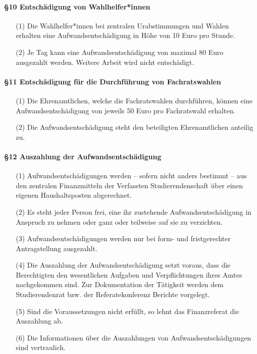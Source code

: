     \paragraph{§10 Entschädigung von Wahlhelfer*innen}
        \begin{itemize}
            \item[(1)] Die Wahlhelfer*innen bei zentralen Urabstimmungen und Wahlen erhalten eine Aufwandsentschädigung in Höhe von 10 Euro pro Stunde.
            \item[(2)] Je Tag kann eine Aufwandsentschädigung von maximal 80 Euro ausgezahlt werden. Weitere Arbeit wird nicht entschädigt. 
        \end{itemize} 
    \paragraph{§11 Entschädigung für die Durchführung von Fachratswahlen}
        \begin{itemize}
            \item[(1)]  Die Ehrenamtlichen, welche die Fachratswahlen durchführen, können eine Aufwandsentschädigung von jeweils 50 Euro pro Fachratswahl erhalten. 
            \item[(2)]  Die Aufwandsentschädigung steht den beteiligten Ehrenamtlichen anteilig zu. 
        \end{itemize}
    \paragraph{§12 Auszahlung der Aufwandsentschädigung}
        \begin{itemize}
            \item[(1)]  Aufwandsentschädigungen werden – sofern nicht anders bestimmt – aus den zentralen Finanzmitteln der Verfassten Studierendenschaft über einen eigenen Haushaltsposten abgerechnet.
            \item[(2)] Es steht jeder Person frei, eine ihr zustehende Aufwandsentschädigung in Anspruch zu nehmen oder ganz oder teilweise auf sie zu verzichten.
            \item[(3)]  Aufwandsentschädigungen werden nur bei form- und fristgerechter Antragstellung ausgezahlt. 
            \item[(4)]  Die Auszahlung der Aufwandsentschädigung setzt voraus, dass die Berechtigten den wesentlichen Aufgaben und Verpflichtungen ihres Amtes nachgekommen sind. Zur Dokumentation der Tätigkeit werden dem Studierendenrat bzw. der Referatekonferenz Berichte vorgelegt.
            \item[(5)] Sind die Voraussetzungen nicht erfüllt, so lehnt das Finanzreferat die Auszahlung ab. 
            \item[(6)]  Die Informationen über die Auszahlungen von Aufwandsentschädigungen sind vertraulich. 
        \end{itemize}
